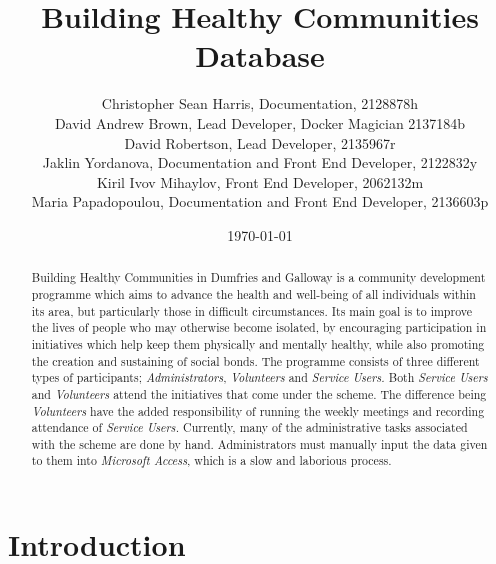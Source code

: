 \documentclass{l3proj}
\begin{document}
\title{Building Healthy Communities Database}

\author{
Christopher Sean Harris, Documentation, 2128878h \\
David Andrew Brown, Lead Developer, Docker Magician 2137184b \\
David Robertson, Lead Developer, 2135967r \\
Jaklin Yordanova, Documentation and Front End Developer, 2122832y \\
Kiril Ivov Mihaylov, Front End Developer, 2062132m \\
Maria Papadopoulou, Documentation and Front End Developer, 2136603p}

\date{\today}

\maketitle

\begin{abstract}

Building Healthy Communities in Dumfries and Galloway is a community development programme which aims to advance the health and well-being of all individuals within its area, but particularly those in difficult circumstances. Its main goal is to improve the lives of people who may otherwise become isolated, by encouraging participation in initiatives which help keep them physically and mentally healthy, while also promoting the creation and sustaining of social bonds. The programme consists of three different types of participants; \textit{Administrators}, \textit{Volunteers} and \textit{Service Users.} Both \textit{Service Users} and \textit{Volunteers} attend the initiatives that come under the scheme. The difference being \textit{Volunteers} have the added responsibility of running the weekly meetings and recording attendance of \textit{Service Users.} Currently, many of the administrative tasks associated with the scheme are done by hand. Administrators must manually input the data given to them into \textit{Microsoft Access}, which is a slow and laborious process.

\end{abstract}

\educationalconsent
\section{Introduction}
\end{document}
